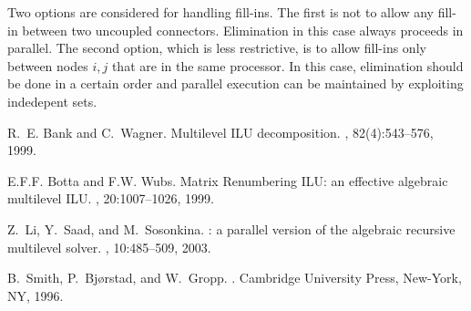 \documentclass{report}
\begin{document}
Two options are considered for handling fill-ins. The first is not to
allow any fill-in between two uncoupled connectors. Elimination in
this case always proceeds in parallel. The second option, which is
less restrictive, is to allow fill-ins only between nodes $i,j$ that
are in the same processor. In this case, elimination should be done
in a certain order and parallel execution can be maintained by
exploiting indedepent sets.


\begin{thebibliography}{1}

R.~E. Bank and C.~Wagner.
\newblock Multilevel {ILU} decomposition.
, 82(4):543--576, 1999.

E.F.F. Botta and F.W. Wubs.
\newblock Matrix {Renumbering} {ILU:} an effective algebraic multilevel {ILU}.
,
20:1007--1026, 1999.

Z.~Li, Y.~Saad, and M.~Sosonkina.
: a parallel version of the algebraic recursive multilevel
solver.
, 10:485--509, 2003.

B.~Smith, P.~Bj{\o}rstad, and W.~Gropp.
.
\newblock Cambridge University Press, New-York, NY, 1996.

\end{thebibliography}
\end{document}
